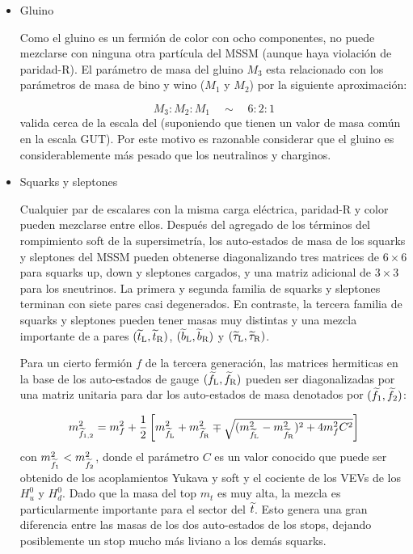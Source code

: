 \begin{itemize}
\item Gluino

Como el gluino es un fermión de color con ocho componentes, no puede mezclarse con ninguna
otra partícula del MSSM (aunque haya violación de paridad-R). El parámetro de
masa del gluino $M_3$ esta relacionado con los parámetros de masa de bino y wino
($M_1$ y $M_2$) por la siguiente aproximación:

\begin{equation}
  M_3 : M_2 : M_1 \quad \sim \quad 6 : 2 : 1
\end{equation}
%
valida cerca de la escala del {\tev} (suponiendo que tienen un valor de masa común
en la escala GUT). Por este motivo es razonable considerar que el gluino es
considerablemente más pesado que los neutralinos y charginos.


\item Squarks y sleptones

Cualquier par de escalares con la misma carga eléctrica, paridad-R y color
pueden mezclarse entre ellos. Después del agregado de los términos del
rompimiento soft de la supersimetría, los auto-estados de masa de los squarks y
sleptones del MSSM pueden obtenerse diagonalizando tres matrices de $6\times6$
para squarks up, down y sleptones cargados, y una matriz adicional de $3\times
3$ para los sneutrinos. La primera y segunda familia de squarks y sleptones
terminan con siete pares casi degenerados. En contraste, la tercera familia de
squarks y sleptones pueden tener masas muy distintas y una mezcla importante de
a pares $(\widetilde{t}_{\mathrm{L}}, \widetilde{t}_{\mathrm{R}})$, $(\widetilde{b}_{\mathrm{L}}, \widetilde{b}_{\mathrm{R}})$ y $(\widetilde{\tau}_{\mathrm{L}}, \widetilde{\tau}_{\mathrm{R}})$.

Para un cierto fermión $f$ de la tercera generación, las matrices hermiticas en
la base de los auto-estados de gauge $(\widetilde{f}_{\mathrm{L}}, \widetilde{f}_{\mathrm{R}})$ pueden ser
diagonalizadas por una matriz unitaria para dar los auto-estados de masa
denotados por $(\widetilde{f}_{\mathrm{1}}, \widetilde{f}_{\mathrm{2}})$:

\begin{equation}
  m_{\widetilde{f}_{\mathrm{1,2}}}^2 = m^2_f + \frac{1}{2} \left[
    m_{\widetilde{f}_{\mathrm{L}}}^2 + m_{\widetilde{f}_{\mathrm{R}}}^2 \mp \sqrt{(m_{\widetilde{f}_{\mathrm{L}}}^2 -
      m_{\widetilde{f}_{\mathrm{R}}}^2)^2 + 4 m_f^2 C^2} \right]
\end{equation}
%
con $m_{\widetilde{f}_{\mathrm{1}}}^2 < m_{\widetilde{f}_{\mathrm{2}}}^2$, donde el parámetro $C$ es un
valor conocido que puede ser obtenido de los acoplamientos Yukava y soft y el
cociente de los VEVs de los $H_u^0$ y $H_d^0$. Dado que la masa del top $m_t$ es
muy alta, la mezcla es particularmente importante para el sector del $\widetilde{t}$.
Esto genera una gran diferencia entre las masas de los dos auto-estados de los
stops, dejando posiblemente un stop mucho más liviano a los demás squarks.

\end{itemize}


